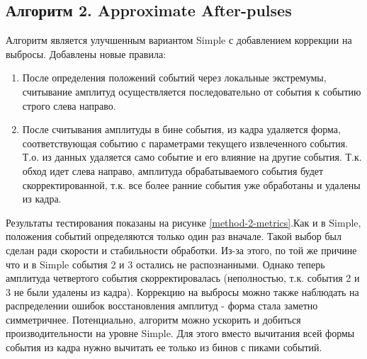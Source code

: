 \documentclass[a4paper,14pt]{extreport}
\begin{document}
\subsection{Алгоритм 2. Approximate After-pulses}
Алгоритм является улучшенным вариантом Simple с добавлением коррекции на выбросы. Добавлены новые правила:
\begin{enumerate}
    \item После определения положений событий через локальные экстремумы, считывание амплитуд осуществляется последовательно от события к событию строго слева направо.
    \item После считывания амплитуды в бине события, из кадра удаляется форма, соответствующая событию с параметрами текущего извлеченного события. Т.о. из данных удаляется само событие и его влияние на другие события. Т.к. обход идет слева направо, амплитуда обрабатываемого события будет скорректированной, т.к. все более ранние события уже обработаны и удалены из кадра.
\end{enumerate}

Результаты тестирования показаны на рисунке \ref{method-2-metrics}.Как и в Simple, положения событий определяются только один раз вначале. Такой выбор был сделан ради скорости и стабильности обработки. Из-за этого, по той же причине что и в Simple события 2 и 3 остались не распознанными. Однако теперь амплитуда четвертого события скорректировалась (неполностью, т.к. события 2 и 3 не были удалены из кадра). Коррекцию на выбросы можно также наблюдать на распределении ошибок восстановления амплитуд - форма стала заметно симметричнее.
Потенциально, алгоритм можно ускорить и добиться производительности на уровне Simple. Для этого вместо вычитания всей формы события из кадра нужно вычитать ее только из бинов с пиками событий.
\end{document}
